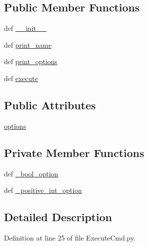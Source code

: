 \subsection*{Public Member Functions}
\begin{DoxyCompactItemize}
\item 
def \hyperlink{class_execute_cmd_1_1_execute_cmd_ae0e361beb27aac47f2c682418577b375}{\-\_\-\-\_\-init\-\_\-\-\_\-}
\item 
def \hyperlink{class_execute_cmd_1_1_execute_cmd_a9021ad1c3f3ed4460d57d42a8d1f23ef}{print\-\_\-name}
\item 
def \hyperlink{class_execute_cmd_1_1_execute_cmd_a8174353fba2a214e50529b2612e078ff}{print\-\_\-options}
\item 
def \hyperlink{class_execute_cmd_1_1_execute_cmd_abd51ca569e60d044fe278b613459c709}{execute}
\end{DoxyCompactItemize}
\subsection*{Public Attributes}
\begin{DoxyCompactItemize}
\item 
\hyperlink{class_execute_cmd_1_1_execute_cmd_aea248b8edd01b26099f3d45b798a65be}{options}
\end{DoxyCompactItemize}
\subsection*{Private Member Functions}
\begin{DoxyCompactItemize}
\item 
def \hyperlink{class_execute_cmd_1_1_execute_cmd_a4ab1a3d66079bcb8de5a4a436282ab5c}{\-\_\-bool\-\_\-option}
\item 
def \hyperlink{class_execute_cmd_1_1_execute_cmd_a657ac6b5c7779499ce426ba18234824e}{\-\_\-positive\-\_\-int\-\_\-option}
\end{DoxyCompactItemize}


\subsection{Detailed Description}


Definition at line 25 of file Execute\-Cmd.\-py.



